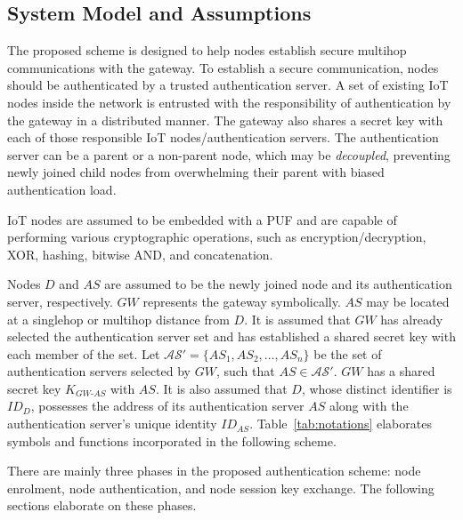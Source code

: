 \documentclass[conference]{IEEEtran}
\begin{document}
\subsection{System Model and Assumptions}
\label{sec:sysmodel}

The proposed scheme is designed to help nodes establish secure multihop
communications with the gateway.  To establish a secure communication, nodes
should be authenticated by a trusted authentication server.  A set of
existing IoT nodes inside the network is entrusted with the responsibility of
authentication by the gateway in a distributed manner.  The gateway also
shares a secret key with each of those responsible IoT
nodes/authentication servers.  The authentication server can be a parent or
a non-parent node, which may be \emph{decoupled}, preventing newly joined
child nodes from overwhelming their parent with biased authentication load.

IoT nodes are assumed to be embedded with a PUF and are capable of performing
various cryptographic operations, such as encryption/decryption, XOR,
hashing, bitwise AND, and concatenation.

Nodes $D$ and $AS$ are assumed to be the newly joined node and its
authentication server, respectively.  $GW$ represents the gateway
symbolically.  $AS$ may be located at a singlehop or multihop distance from
$D$.  It is assumed that $GW$ has already selected the authentication server
set and has established a shared secret key with each member of the set.
Let $\mathcal{AS}' = \{AS_1, AS_2, \ldots, AS_n\}$ be the set of
authentication servers selected by $GW$, such that $AS \in \mathcal{AS}'$.
$GW$ has a shared secret key $K_{GW\text{-}AS}$ with $AS$.  It is also
assumed that $D$, whose distinct identifier is $ID_D$, possesses the address
of its authentication server $AS$ along with the authentication server's unique identity $ID_{AS}$.
Table~\ref{tab:notations} elaborates symbols and functions incorporated in
the following scheme.

There are mainly three phases in the proposed authentication scheme: node enrolment, node authentication, and node
session key exchange.  The following sections elaborate on these phases.
\end{document}
